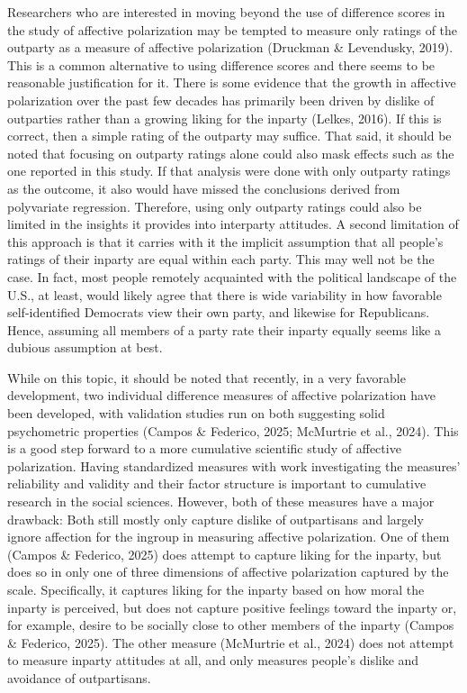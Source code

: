 \documentclass[authordate, meta, issue]{jote-new-article}
\begin{document}
	Researchers who are interested in moving beyond the use of difference scores in the study of affective polarization may be tempted to measure only ratings of the outparty as a measure of affective polarization (Druckman \& Levendusky, 2019). This is a common alternative to using difference scores and there seems to be reasonable justification for it. There is some evidence that the growth in affective polarization over the past few decades has primarily been driven by dislike of outparties rather than a growing liking for the inparty (Lelkes, 2016). If this is correct, then a simple rating of the outparty may suffice. That said, it should be noted that focusing on outparty ratings alone could also mask effects such as the one reported in this study. If that analysis were done with only outparty ratings as the outcome, it also would have missed the conclusions derived from polyvariate regression. Therefore, using only outparty ratings could also be limited in the insights it provides into interparty attitudes. A second limitation of this approach is that it carries with it the implicit assumption that all people's ratings of their inparty are equal within each party. This may well not be the case. In fact, most people remotely acquainted with the political landscape of the U.S., at least, would likely agree that there is wide variability in how favorable self-identified Democrats view their own party, and likewise for Republicans. Hence, assuming all members of a party rate their inparty equally seems like a dubious assumption at best.



	While on this topic, it should be noted that recently, in a very favorable development, two individual difference measures of affective polarization have been developed, with validation studies run on both suggesting solid psychometric properties (Campos \& Federico, 2025; McMurtrie et al., 2024). This is a good step forward to a more cumulative scientific study of affective polarization. Having standardized measures with work investigating the measures' reliability and validity and their factor structure is important to cumulative research in the social sciences. However, both of these measures have a major drawback: Both still mostly only capture dislike of outpartisans and largely ignore affection for the ingroup in measuring affective polarization. One of them (Campos \& Federico, 2025) does attempt to capture liking for the inparty, but does so in only one of three dimensions of affective polarization captured by the scale. Specifically, it captures liking for the inparty based on how moral the inparty is perceived, but does not capture positive feelings toward the inparty or, for example, desire to be socially close to other members of the inparty (Campos \& Federico, 2025). The other measure (McMurtrie et al., 2024) does not attempt to measure inparty attitudes at all, and only measures people's dislike and avoidance of outpartisans.
\end{document}
